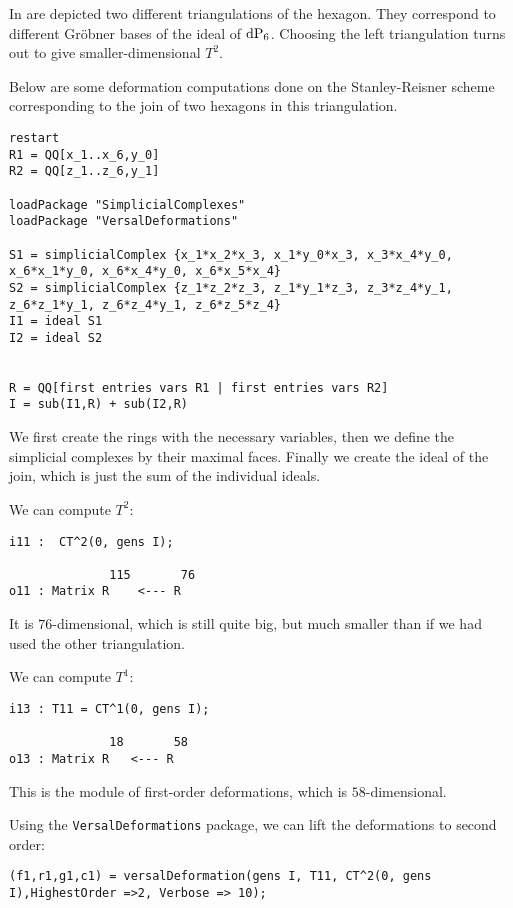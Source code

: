 \documentclass[11pt, english]{article}
\begin{document}
In  are depicted two different triangulations of the hexagon. They correspond to different Gröbner bases of the ideal of $\dP6$. Choosing the left triangulation turns out to give smaller-dimensional $T^2$.

Below are some deformation computations done on the Stanley-Reisner scheme corresponding to the join of two hexagons in this triangulation.

\begin{lstlisting}
restart
R1 = QQ[x_1..x_6,y_0]
R2 = QQ[z_1..z_6,y_1]

loadPackage "SimplicialComplexes"
loadPackage "VersalDeformations"

S1 = simplicialComplex {x_1*x_2*x_3, x_1*y_0*x_3, x_3*x_4*y_0, x_6*x_1*y_0, x_6*x_4*y_0, x_6*x_5*x_4}
S2 = simplicialComplex {z_1*z_2*z_3, z_1*y_1*z_3, z_3*z_4*y_1, z_6*z_1*y_1, z_6*z_4*y_1, z_6*z_5*z_4}
I1 = ideal S1
I2 = ideal S2


R = QQ[first entries vars R1 | first entries vars R2]
I = sub(I1,R) + sub(I2,R)
\end{lstlisting}

We first create the rings with the necessary variables, then we define the simplicial complexes by their maximal faces. Finally we create the ideal of the join, which is just the sum of the individual ideals.

We can compute $T^2$:

\begin{lstlisting}
i11 :  CT^2(0, gens I);

              115       76
o11 : Matrix R    <--- R
\end{lstlisting}

It is $76$-dimensional, which is still quite big, but much smaller than if we had used the other triangulation.

We can compute $T^1$:

\begin{lstlisting}
i13 : T11 = CT^1(0, gens I);

              18       58
o13 : Matrix R   <--- R
\end{lstlisting}

This is the module of first-order deformations, which is $58$-dimensional.

Using the \texttt{VersalDeformations} package, we can lift the deformations to second order:
\begin{lstlisting}
(f1,r1,g1,c1) = versalDeformation(gens I, T11, CT^2(0, gens I),HighestOrder =>2, Verbose => 10);
\end{lstlisting}
\end{document}
